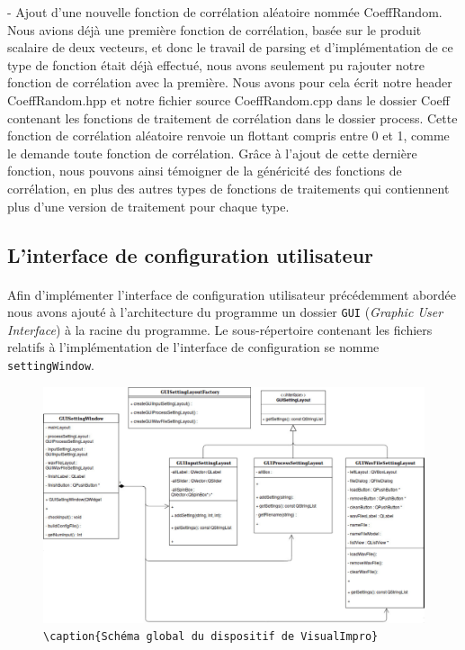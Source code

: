   - Ajout d'une nouvelle fonction de corrélation aléatoire nommée CoeffRandom.
  Nous avions déjà une première fonction de corrélation, basée sur le produit
  scalaire de deux vecteurs, et donc le travail de parsing et d'implémentation
  de ce type de fonction était déjà effectué, nous avons seulement pu rajouter
  notre fonction de corrélation avec la première. Nous avons pour cela écrit
  notre header CoeffRandom.hpp et notre fichier source CoeffRandom.cpp dans le
  dossier Coeff contenant les fonctions de traitement de corrélation dans le
  dossier process. Cette fonction de corrélation aléatoire renvoie un flottant
  compris entre 0 et 1, comme le demande toute fonction de corrélation. Grâce à
  l'ajout de cette dernière fonction, nous pouvons ainsi témoigner de la
  généricité des fonctions de corrélation, en plus des autres types de fonctions
  de traitements qui contiennent plus d'une version de traitement pour chaque
  type.

\subsection{L'interface de configuration utilisateur}
\paragraph{}
Afin d'implémenter l'interface de configuration utilisateur précédemment abordée
nous avons ajouté à l'architecture du programme un dossier
\verb!GUI! (\textit{Graphic User Interface}) à la racine du programme.
Le sous-répertoire contenant les fichiers relatifs à l'implémentation de
l'interface de configuration se nomme \verb!settingWindow!.

\begin{figure}[h]
 \centering
 \includegraphics[scale=0.3]{umlSettingWindow.png}
 \verb!\caption{Schéma global du dispositif de VisualImpro}!
 \label{schéma global}
\end{figure}

